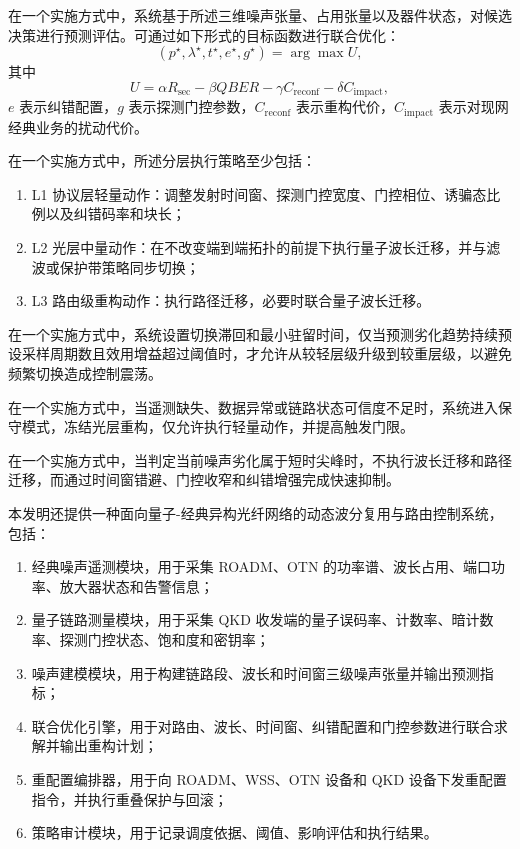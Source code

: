 \documentclass[12pt,a4paper]{article}
\begin{document}
在一个实施方式中，系统基于所述三维噪声张量、占用张量以及器件状态，对候选决策进行预测评估。可通过如下形式的目标函数进行联合优化：
\[
(p^\star,\lambda^\star,t^\star,e^\star,g^\star)=\arg\max U,
\]
其中
\[
U=\alpha R_{\mathrm{sec}}-\beta QBER-\gamma C_{\mathrm{reconf}}-\delta C_{\mathrm{impact}},
\]
$e$ 表示纠错配置，$g$ 表示探测门控参数，$C_{\mathrm{reconf}}$ 表示重构代价，$C_{\mathrm{impact}}$ 表示对现网经典业务的扰动代价。

在一个实施方式中，所述分层执行策略至少包括：
\begin{enumerate}[leftmargin=2em]
    \item L1 协议层轻量动作：调整发射时间窗、探测门控宽度、门控相位、诱骗态比例以及纠错码率和块长；
    \item L2 光层中量动作：在不改变端到端拓扑的前提下执行量子波长迁移，并与滤波或保护带策略同步切换；
    \item L3 路由级重构动作：执行路径迁移，必要时联合量子波长迁移。
\end{enumerate}

在一个实施方式中，系统设置切换滞回和最小驻留时间，仅当预测劣化趋势持续预设采样周期数且效用增益超过阈值时，才允许从较轻层级升级到较重层级，以避免频繁切换造成控制震荡。

在一个实施方式中，当遥测缺失、数据异常或链路状态可信度不足时，系统进入保守模式，冻结光层重构，仅允许执行轻量动作，并提高触发门限。

在一个实施方式中，当判定当前噪声劣化属于短时尖峰时，不执行波长迁移和路径迁移，而通过时间窗错避、门控收窄和纠错增强完成快速抑制。

本发明还提供一种面向量子-经典异构光纤网络的动态波分复用与路由控制系统，包括：
\begin{enumerate}[leftmargin=2em]
    \item 经典噪声遥测模块，用于采集 ROADM、OTN 的功率谱、波长占用、端口功率、放大器状态和告警信息；
    \item 量子链路测量模块，用于采集 QKD 收发端的量子误码率、计数率、暗计数率、探测门控状态、饱和度和密钥率；
    \item 噪声建模模块，用于构建链路段、波长和时间窗三级噪声张量并输出预测指标；
    \item 联合优化引擎，用于对路由、波长、时间窗、纠错配置和门控参数进行联合求解并输出重构计划；
    \item 重配置编排器，用于向 ROADM、WSS、OTN 设备和 QKD 设备下发重配置指令，并执行重叠保护与回滚；
    \item 策略审计模块，用于记录调度依据、阈值、影响评估和执行结果。
\end{enumerate}
\end{document}
